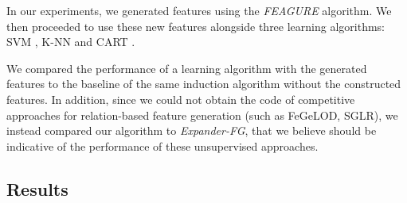 \documentclass{article}
\theoremstyle{definition}
\begin{document}
 In our experiments, we generated features using the \emph{FEAGURE} algorithm. We then proceeded to use these new features alongside three learning algorithms: SVM \citep{cortes1995support}, K-NN \citep{fix1951discriminatory} and CART \citep{breiman1984classification}.
 
 We compared the performance of a learning algorithm with the generated features to the baseline of the same induction algorithm without the constructed features.
 In addition, since we could not obtain the code of competitive approaches for relation-based feature generation (such as FeGeLOD, SGLR), we instead compared our algorithm to \emph{Expander-FG}, that we believe should be indicative of the performance of these unsupervised approaches.


	
	


\subsection{Results}
\end{document}
